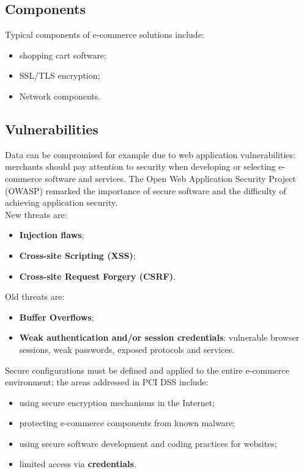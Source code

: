 \documentclass[a4paper, 10pt, titlepage]{article}
\begin{document}
\subsection{Components}
Typical components of e-commerce solutions include:
\begin{itemize}
\item shopping cart software;
\item SSL/TLS encryption;
\item Network components.
\end{itemize}

\subsection{Vulnerabilities}
Data can be compromised for example due to web application vulnerabilities: merchants should pay attention to security when developing or selecting e-commerce software and services. The Open Web Application Security Project (OWASP) remarked the importance of secure software and the difficulty of achieving application security. \medskip\\
New threats are:
\begin{itemize}
\item \textbf{Injection flaws};
\item \textbf{Cross-site Scripting (XSS)};
\item \textbf{Cross-site Request Forgery (CSRF)}.
\end{itemize}
Old threats are:
\begin{itemize}
\item \textbf{Buffer Overflows};
\item \textbf{Weak authentication and/or session credentials}: vulnerable browser sessions, weak passwords, exposed protocols and services.
\end{itemize}
Secure configurations must be defined and applied to the entire e-commerce environment; the areas addressed in PCI DSS include:
\begin{itemize}
\item using secure encryption mechanisms in the Internet;
\item protecting e-commerce components from known malware;
\item using secure software development and coding practices for websites;
\item limited access via \textbf{credentials}.
\end{itemize}
\end{document}
